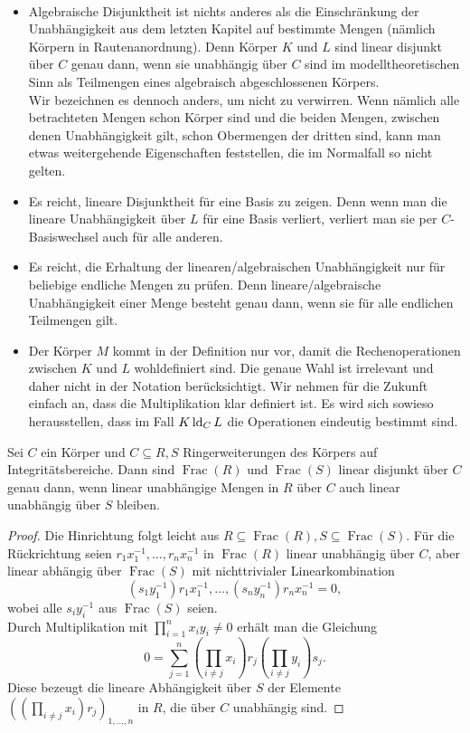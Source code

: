     \begin{remark}
    	\ 
    	\begin{itemize}
    		\item Algebraische Disjunktheit ist nichts anderes als die Einschränkung der Unabhängigkeit aus dem letzten Kapitel auf bestimmte Mengen (nämlich Körpern in Rautenanordnung). Denn Körper $K$ und $L$ sind linear disjunkt über $C$ genau dann, wenn sie unabhängig über $C$ sind im modelltheoretischen Sinn als Teilmengen eines algebraisch abgeschlossenen Körpers.\\
    		Wir bezeichnen es dennoch anders, um nicht zu verwirren. Wenn nämlich alle betrachteten Mengen schon Körper sind und die beiden Mengen, zwischen denen Unabhängigkeit gilt, schon Obermengen der dritten sind, kann man etwas weitergehende Eigenschaften feststellen, die im Normalfall so nicht gelten.
    		\item Es reicht, lineare Disjunktheit für eine Basis zu zeigen. Denn wenn man die lineare Unabhängigkeit über $L$ für eine Basis verliert, verliert man sie per $C$-Basiswechsel auch für alle anderen.
    		\item Es reicht, die Erhaltung der linearen/algebraischen Unabhängigkeit nur für beliebige endliche Mengen zu prüfen. Denn lineare/algebraische Unabhängigkeit einer Menge besteht genau dann, wenn sie für alle endlichen Teilmengen gilt.
    		\item Der Körper $M$ kommt in der Definition nur vor, damit die Rechenoperationen zwischen $K$ und $L$ wohldefiniert sind. Die genaue Wahl ist irrelevant und daher nicht in der Notation berücksichtigt. Wir nehmen für die Zukunft einfach an, dass die Multiplikation klar definiert ist. Es wird sich sowieso herausstellen, dass im Fall $K\operatorname{ld}_CL$ die Operationen eindeutig bestimmt sind.
    	\end{itemize}
    \end{remark}
    
    \begin{lemma}\label{Fraktionskörper}
    	Sei $C$ ein Körper und $C\subseteq R,S$ Ringerweiterungen des Körpers auf Integritätsbereiche. Dann sind $\operatorname{Frac}(R)$ und $\operatorname{Frac}(S)$ linear disjunkt über $C$ genau dann, wenn linear unabhängige Mengen in $R$ über $C$ auch linear unabhängig über $S$ bleiben.
    \end{lemma}
    \begin{proof}
    	Die Hinrichtung folgt leicht aus $R\subseteq\operatorname{Frac}(R),S\subseteq\operatorname{Frac}(S)$. Für die Rückrichtung seien $r_1x_1^{-1},\dots,r_nx_n^{-1}$ in $\operatorname{Frac}(R)$ linear unabhängig über $C$, aber linear abhängig über $\operatorname{Frac}(S)$ mit nichttrivialer Linearkombination $$(s_1y_1^{-1})r_1x_1^{-1},\dots,(s_ny_n^{-1})r_nx_n^{-1}=0,$$ wobei alle $s_iy_i^{-1}$ aus $\operatorname{Frac}(S)$ seien.\\
    	Durch Multiplikation mit $\prod\limits_{i=1}^nx_iy_i\neq0$ erhält man die Gleichung $$0=\sum\limits_{j=1}^n(\prod\limits_{i\neq j}x_i)r_j(\prod\limits_{i\neq j}y_i)s_j.$$ Diese bezeugt die lineare Abhängigkeit über $S$ der Elemente $((\prod\limits_{i\neq j}x_i)r_j)_{1,\dots,n}$ in $R$, die über $C$ unabhängig sind.
    \end{proof}
    
